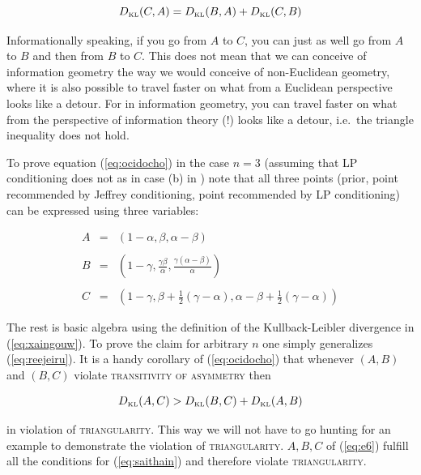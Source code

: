 \documentclass[phd,12pt,oneside]{ubcthesis}
\begin{document}
\begin{equation}
  \label{eq:ocidocho}
  D_{\mbox{\tiny KL}}(C,A)=D_{\mbox{\tiny KL}}(B,A)+D_{\mbox{\tiny KL}}(C,B)
\end{equation}

Informationally speaking, if you go from $A$ to $C$, you can just as
well go from $A$ to $B$ and then from $B$ to $C$. This does not mean
that we can conceive of information geometry the way we would conceive
of non-Euclidean geometry, where it is also possible to travel faster
on what from a Euclidean perspective looks like a detour. For in
information geometry, you can travel faster on what from the
perspective of information theory (!) looks like a detour, i.e.\ the
triangle inequality does not hold. 

To prove equation (\ref{eq:ocidocho}) in the case $n=3$ (assuming that
LP conditioning does not  as in case (b) in
) note that all three points
(prior, point recommended by Jeffrey conditioning, point recommended
by LP conditioning) can be expressed using three variables:

\begin{equation}
  \label{eq:reejeiru}
  \begin{array}{rcl}
    A&=&\left(1-\alpha,\beta,\alpha-\beta\right) \\
     && \\
    B&=&\left(1-\gamma,\frac{\gamma\beta}{\alpha},\frac{\gamma(\alpha-\beta)}{\alpha}\right) \\
     && \\
    C&=&\left(1-\gamma,\beta+\frac{1}{2}(\gamma-\alpha),\alpha-\beta+\frac{1}{2}(\gamma-\alpha)\right)
  \end{array}
\end{equation}

The rest is basic algebra using the definition of the Kullback-Leibler
divergence in (\ref{eq:xaingouw}). To prove the claim for arbitrary
$n$ one simply generalizes (\ref{eq:reejeiru}). It is a handy
corollary of (\ref{eq:ocidocho}) that whenever $(A,B)$ and $(B,C)$
violate \textsc{transitivity of asymmetry} then

\begin{equation}
  \label{eq:saithain}
  D_{\mbox{\tiny KL}}(A,C)>D_{\mbox{\tiny KL}}(B,C)+D_{\mbox{\tiny KL}}(A,B)
\end{equation}

{\noindent}in violation of \textsc{triangularity}. This way we will not have to
go hunting for an example to demonstrate the violation of
\textsc{triangularity}. $A,B,C$ of (\ref{eq:e6}) fulfill all the
conditions for (\ref{eq:saithain}) and therefore violate
\textsc{triangularity}.
\end{document}
